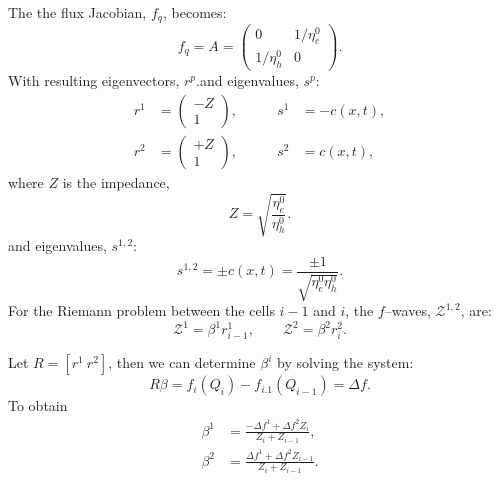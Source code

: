 \documentclass[]{article}
\newcommand{\Z}{\mathcal{Z}}
\begin{document}
The the flux Jacobian, $f_q$, becomes:
\begin{equation}\label{eq:appendix.riemann.1d.defqf}
	f_q = A =\left(\begin{array}{cc} 0 & 1/\eta_e^0 \\ 1/\eta_h^0 & 0 \end{array}\right).
\end{equation}
With resulting eigenvectors, $r^p$.and eigenvalues, $s^p$:
\begin{subequations}\label{eq:appendix.riemann.1d.r12}
	\begin{alignat}{3}
		r^1&=\left(\begin{array}{c} -Z \\ 1\end{array}\right), &\qquad s^1 &= -c(x,t)\label{eq:emlinear.1d.r1},\\
		r^2&=\left(\begin{array}{c}+Z \\ 1\end{array}\right), &\qquad s^2 &=  c(x,t)\label{eq:emlinear.1d.r2},
	\end{alignat}
\end{subequations}
where $Z$ is the impedance,
\begin{equation}\label{eq:emlinear.1d.z}
	Z=\sqrt{\frac{\eta_e^0}{\eta_h^0}}.
\end{equation}
and eigenvalues, $s^{1,2}$:
\begin{equation}\label{eq:appendix.riemann.1d.vpm}
	s^{1,2}=\pm c(x,t) = \frac{\pm 1}{\sqrt{\eta_e^0\eta_h^0}}.
\end{equation}
For the Riemann problem between the cells $i-1$ and $i$, the $f$--waves, $\Z^{1,2}$, are:
\begin{equation}\label{eq:appendix.riemann.1d.defw}
	\Z^1=\beta^1r^1_{i-1}, \qquad \Z^2=\beta^2r^2_{i}.
\end{equation}

Let $R=[r^1\:r^2]$, then we can determine $\beta^i$ by solving the system:
\begin{equation}\label{eq:appendix.riemann.1d.defbeta}
	R\beta = f_i(Q_i)-f_{i.1}(Q_{i-1}) = \Delta f.
\end{equation}
To obtain
\begin{subequations}\label{eq:appendix.riemann.1d.beta}
\begin{alignat}{1}
	\beta^1&=\frac{-\Delta f^1+\Delta f^2Z_i}{Z_i + Z_{i-1}}\label{eq:appendix.riemann.1d.beta1},\\
	\beta^2&=\frac{\Delta f^1+\Delta f^2Z_{i-1}}{Z_i + Z_{i-1}}\label{eq:appendix.riemann.1d.beta2}.
\end{alignat}
\end{subequations}
\end{document}
